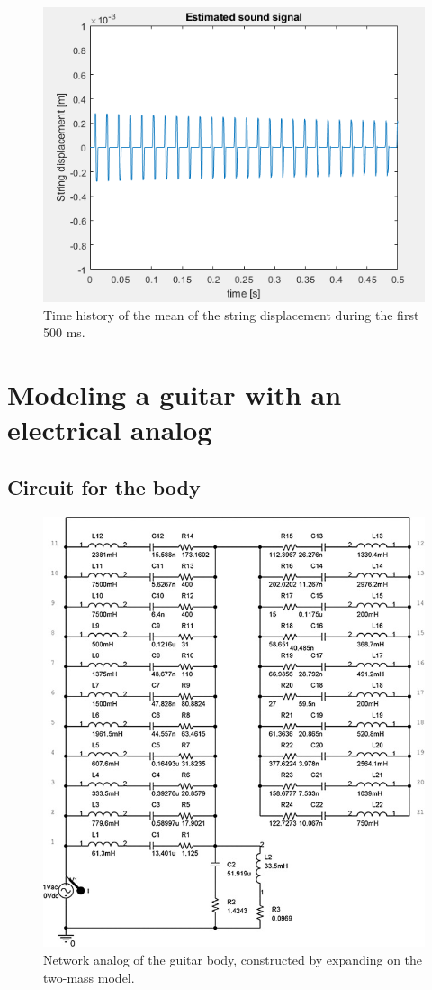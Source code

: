 \documentclass[a4paper]{article}
\begin{document}
 \begin{figure}[h]
	\centering
	\includegraphics[width=0.75\linewidth]{sound_one.png}
	\caption{Time history of the mean of the string displacement during the first 500 ms.}
	\label{fig:historytwo}
\end{figure}

\section{Modeling a guitar with an electrical analog}
\subsection{Circuit for the body}

\begin{figure}[h!]
	\centering
	\includegraphics[width=0.5\linewidth]{guitar_body.jpg}
	\caption{Network analog of the guitar body, constructed by expanding on the two-mass model.}
	\label{fig:body}
\end{figure}
\end{document}
